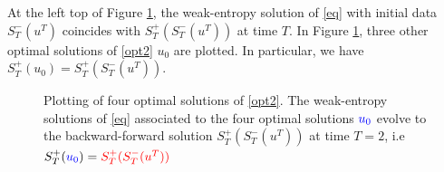\documentclass{article}
\begin{document}
 
  
   
  \par  At the  left top of Figure \ref{video}, the weak-entropy solution of \eqref{eq}  with initial data $S_T^-(u^T)$ coincides with $S_T^+ (S_T^-(u^T))$ at time $T$. In Figure \ref{video}, three other optimal solutions of \eqref{opt2} $u_0$ are plotted. In particular, we have $S_T^+ (u_0)=S_T^+ (S_T^-(u^T))$. 





\begin{figure}[H]
\begin{center}
\end{center}
\caption{ Plotting of four optimal solutions of \eqref{opt2}.  The weak-entropy solutions of \eqref{eq} associated to the four optimal solutions $\textcolor{blue}{u_0}$ evolve to the backward-forward solution $S_T^+(S_T^-(u^T))$ at time $T=2$, i.e
$S_T^+(\textcolor{blue}{u_0})=\textcolor{red}{S_T^+(S_T^-(u^T))}$ \label{video}}
\end{figure}











\footnotesize


\end{document}
